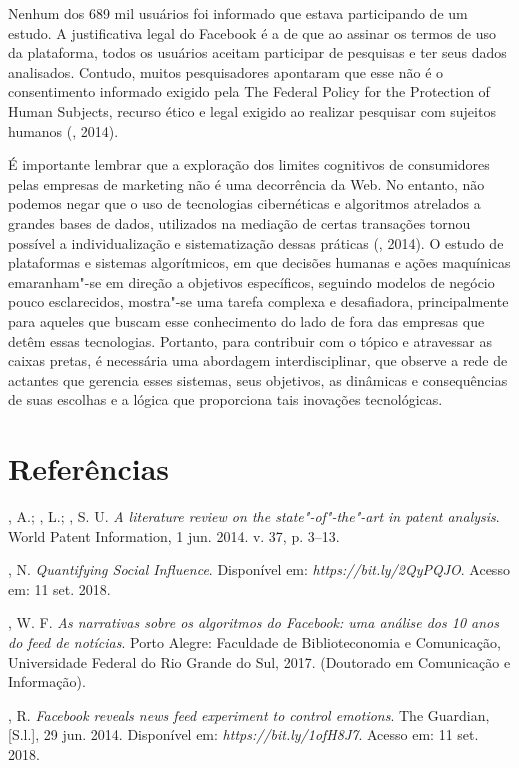 Nenhum dos 689 mil usuários foi informado que estava participando de um
estudo. A justificativa legal do Facebook é a de que ao assinar os
termos de uso da plataforma, todos os usuários aceitam participar de
pesquisas e ter seus dados analisados. Contudo, muitos pesquisadores
apontaram que esse não é o consentimento informado exigido pela The
Federal Policy for the Protection of Human Subjects, recurso ético e
legal exigido ao realizar pesquisar com sujeitos humanos (, 2014).

É importante lembrar que a exploração dos limites cognitivos de
consumidores pelas empresas de marketing não é uma decorrência da Web.
No entanto, não podemos negar que o uso de tecnologias cibernéticas e
algoritmos atrelados a grandes bases de dados, utilizados na mediação de
certas transações tornou possível a individualização e sistematização
dessas práticas (, 2014). O estudo de plataformas e sistemas
algorítmicos, em que decisões humanas e ações maquínicas emaranham"-se em
direção a objetivos específicos, seguindo modelos de negócio pouco
esclarecidos, mostra"-se uma tarefa complexa e desafiadora,
principalmente para aqueles que buscam esse conhecimento do lado de fora
das empresas que detêm essas tecnologias. Portanto, para contribuir com
o tópico e atravessar as caixas pretas, é necessária uma abordagem
interdisciplinar, que observe a rede de actantes que gerencia esses
sistemas, seus objetivos, as dinâmicas e consequências de suas escolhas
e a lógica que proporciona tais inovações tecnológicas.

\section{Referências}

, A.; , L.; , S. U. \emph{A literature review on the
state"-of"-the"-art in patent analysis}. World Patent Information, 1 jun.
2014. v. 37, p. 3--13.

, N. \emph{Quantifying Social Influence}. Disponível em:
\emph{https://bit.ly/2QyPQJO}. Acesso em: 11 set. 2018.

, W. F. \emph{As narrativas sobre os algoritmos do Facebook: uma
análise dos 10 anos do feed de notícias}. Porto Alegre: Faculdade de
Biblioteconomia e Comunicação, Universidade Federal do Rio Grande do
Sul, 2017. (Doutorado em Comunicação e Informação).

, R. \emph{Facebook reveals news feed experiment to control
emotions}. The Guardian, [S.l.], 29 jun. 2014. Disponível em:
\emph{https://bit.ly/1ofH8J7}. Acesso em: 11 set. 2018.

